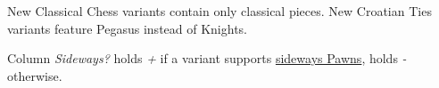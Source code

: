 
New Classical Chess variants contain only classical pieces. New Croatian Ties
variants feature Pegasus instead of Knights.

Column \emph{Sideways?} holds \emph{+} if a variant supports
\hyperref[sec:Simple variants/Croatian Ties variants/Sideways Pawns]{sideways Pawns},
holds \emph{-} otherwise.

\TODO

\clearpage %

